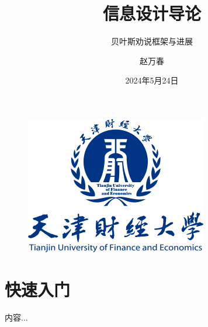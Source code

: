\documentclass{beamer}
\author{赵万春}
\title{信息设计导论}
\subtitle{贝叶斯劝说框架与进展}
\institute{天津财经大学 金融学院}
\date{2024年5月24日}
\begin{document}
	
\kaishu
\begin{frame}
	\titlepage
	\begin{figure}[htpb]
		\begin{center}
			\includegraphics[width=0.2\linewidth]{pic/TJUFE_logo.png}
		\end{center}
	\end{figure}
\end{frame}	
	
\begin{frame}
	\tableofcontents[sectionstyle=show,subsectionstyle=show/shaded/hide,subsubsectionstyle=show/shaded/hide]
\end{frame}

\section{快速入门}
\begin{frame}
	内容...
\end{frame}
	
	
\end{document}
